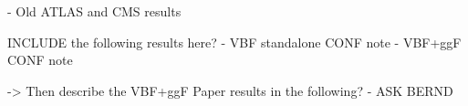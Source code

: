 - Old ATLAS and CMS results

INCLUDE the following results here?
- VBF standalone CONF note
- VBF+ggF CONF note

-> Then describe the VBF+ggF Paper results in the following?
- ASK BERND

